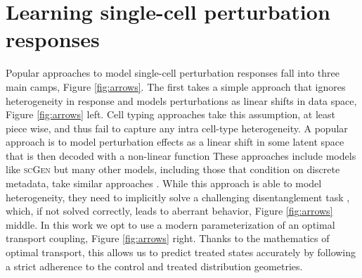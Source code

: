 
\section{Learning single-cell perturbation responses}
Popular approaches to model single-cell perturbation responses fall into three main camps, Figure \ref{fig:arrows}.
The first takes a simple approach that ignores heterogeneity in response and models perturbations as linear shifts in data space, Figure \ref{fig:arrows} left.
Cell typing approaches take this assumption, at least piece wise, and thus fail to capture any intra cell-type heterogeneity.
A popular approach is to model perturbation effects as a linear shift in some latent space that is then decoded with a non-linear function
These approaches include models like \textsc{scGen} \cite{lotfollahi2019} but many other models, including those that condition on discrete metadata,
take similar approaches \cite{lopez2018, lotfollahi2022, lotfollahi2023, bereket2023}.
While this approach is able to model heterogeneity, they need to implicitly solve a challenging disentanglement task \cite{locatello2019}, which, if not solved correctly, leads to aberrant behavior, Figure \ref{fig:arrows} middle. 
In this work we opt to use a modern parameterization of an optimal transport coupling, Figure \ref{fig:arrows} right.
Thanks to the mathematics of optimal transport, this allows us to predict treated states accurately by following a strict adherence to the control and treated distribution geometries.


